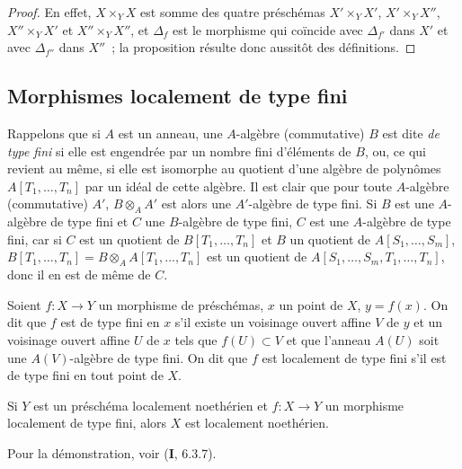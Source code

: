 \begin{proof}
En effet, $X\times_YX$ est somme des quatre préschémas
$X'\times_YX'$, $X'\times_YX''$, $X''\times_YX'$ et $X''\times_YX''$, et
$\Delta_f$ est le morphisme qui coïncide avec $\Delta_{f'}$ dans $X'$ et avec
$\Delta_{f''}$ dans $X''$~; la proposition résulte donc aussitôt des
définitions.
\end{proof}

\subsection{Morphismes localement de type fini}
\label{subsection:IV.1.3-fr}

\begin{env}[1.3.1]
\label{IV.1.3.1-fr}
Rappelons que si $A$ est un anneau, une $A$-algèbre (commutative) $B$ est dite
\emph{de type fini} si elle est engendrée par un nombre fini d'éléments de
$B$, ou, ce qui revient au même, si elle est isomorphe au quotient d'une
algèbre de polynômes $A[T_1,\ldots,T_n]$ par un idéal de cette algèbre. Il est
clair que pour toute $A$-algèbre (commutative) $A'$,
$B\otimes_AA'$ est alors une $A'$-algèbre de type fini. Si $B$ est une
$A$-algèbre de type fini et $C$ une $B$-algèbre de type fini, $C$ est une
$A$-algèbre de type fini, car si $C$ est un quotient de
$B[T_1,\ldots,T_n]$ et $B$ un quotient de $A[S_1,\ldots,S_m]$,
$B[T_1,\ldots,T_n]=B\otimes_AA[T_1,\ldots,T_n]$ est un quotient de
$A[S_1,\ldots,S_m,T_1,\ldots,T_n]$, donc il en est de même de $C$.
\end{env}

\begin{definition}[1.3.2]
\label{IV.1.3.2-fr}
Soient $f:X\to Y$ un morphisme de préschémas, $x$ un point de $X$,
$y=f(x)$. On dit que $f$ est de type fini en $x$ s'il existe un
voisinage ouvert affine $V$ de $y$ et un voisinage ouvert affine $U$ de $x$
tels que $f(U)\subset V$ et que l'anneau $A(U)$ soit une $A(V)$-algèbre de
type fini. On dit que $f$ est localement de type fini s'il est de type
fini en tout point de $X$.
\end{definition}


\begin{proposition}[1.3.3]
\label{IV.1.3.3-fr}
Si $Y$ est un préschéma localement noethérien et $f:X\to Y$ un morphisme
localement de type fini, alors $X$ est localement noethérien.
\end{proposition}

Pour la démonstration, voir (\textbf{I}, 6.3.7).

